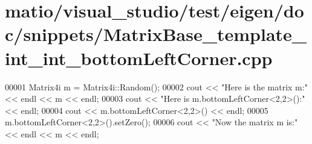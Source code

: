 \hypertarget{matio_2visual__studio_2test_2eigen_2doc_2snippets_2_matrix_base__template__int__int__bottom_left_corner_8cpp_source}{}\section{matio/visual\+\_\+studio/test/eigen/doc/snippets/\+Matrix\+Base\+\_\+template\+\_\+int\+\_\+int\+\_\+bottom\+Left\+Corner.cpp}
\label{matio_2visual__studio_2test_2eigen_2doc_2snippets_2_matrix_base__template__int__int__bottom_left_corner_8cpp_source}

\begin{DoxyCode}
00001 Matrix4i m = Matrix4i::Random();
00002 cout << \textcolor{stringliteral}{"Here is the matrix m:"} << endl << m << endl;
00003 cout << \textcolor{stringliteral}{"Here is m.bottomLeftCorner<2,2>():"} << endl;
00004 cout << m.bottomLeftCorner<2,2>() << endl;
00005 m.bottomLeftCorner<2,2>().setZero();
00006 cout << \textcolor{stringliteral}{"Now the matrix m is:"} << endl << m << endl;
\end{DoxyCode}
